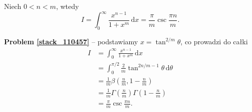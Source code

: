 %

\begin{problem}[pytanie 110457]
    \label{stack_110457}%
    Niech $0 < n < m$, wtedy
    \begin{equation}
        I = \int_0^\infty \frac{x^{n-1}}{1 + x^m} \,\mathrm{d} x = \frac \pi m \operatorname{csc} \frac {\pi n}{m}.
    \end{equation}
\end{problem}

\textbf{Problem \ref{stack_110457}} -- podstawiamy $x = \tan^{2/m} \theta$, co prowadzi do całki %
\begin{align} %
    I & = \int_0^\infty \frac{x^{n-1}}{1 + x^m} \,\mathrm{d} x \\ %
      & = \int_0^{\pi/2} \frac 2 m \tan^{2n/m - 1} \theta \,\mathrm{d}\theta \\ %
      & = \frac 1 m \beta\left( \frac nm, 1 - \frac nm \right) \\ %
      & = \frac 1 m \Gamma \left(\frac nm\right) \Gamma \left(1 - \frac nm\right) \\ %
      & = \frac \pi m \operatorname{csc} \frac {\pi n}{m}. %
\end{align} %

%
